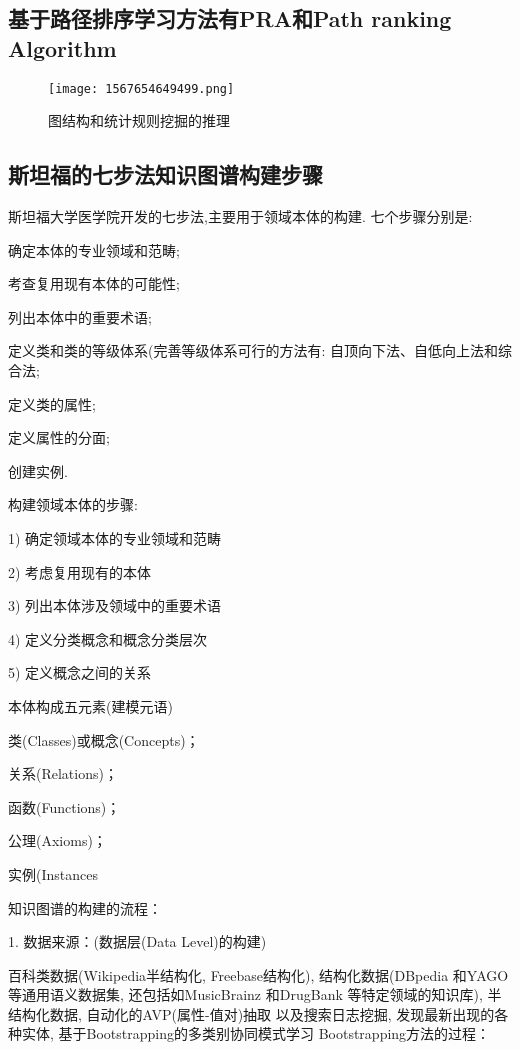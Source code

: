 \subsection{基于路径排序学习方法有PRA和Path ranking Algorithm}
\begin{figure}[H]
\centering
\texttt{[image: 1567654649499.png]}
\caption{图结构和统计规则挖掘的推理}
\label{AI321567654649499}
\end{figure}
\subsection{斯坦福的七步法知识图谱构建步骤}
斯坦福大学医学院开发的七步法,主要用于领域本体的构建. 七个步骤分别是:

 确定本体的专业领域和范畴;

 考查复用现有本体的可能性;

 列出本体中的重要术语;

 定义类和类的等级体系(完善等级体系可行的方法有: 自顶向下法、自低向上法和综合法;

  定义类的属性;

  定义属性的分面;

  创建实例.

构建领域本体的步骤:

1) 确定领域本体的专业领域和范畴

2) 考虑复用现有的本体

3) 列出本体涉及领域中的重要术语

4) 定义分类概念和概念分类层次

5) 定义概念之间的关系

本体构成五元素(建模元语)

 类(Classes)或概念(Concepts)；

  关系(Relations)；

 函数(Functions)；

 公理(Axioms)；

 实例(Instances

知识图谱的构建的流程：

1. 数据来源：(数据层(Data Level)的构建)

百科类数据(Wikipedia半结构化, Freebase结构化),
结构化数据(DBpedia 和YAGO 等通用语义数据集, 还包括如MusicBrainz 和DrugBank 等特定领域的知识库),
半结构化数据, 自动化的AVP(属性-值对)抽取
以及搜索日志挖掘, 发现最新出现的各种实体, 基于Bootstrapping的多类别协同模式学习
      Bootstrapping方法的过程：

